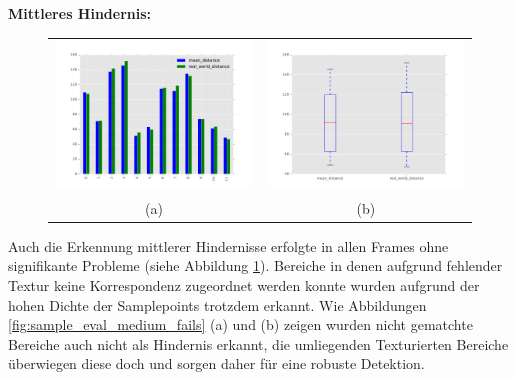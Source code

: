 	\noindent
	\textbf{Mittleres Hindernis:}\\

	\begin{figure}[h]
		\centering
		\begin{tabular}{cc}
		\includegraphics[width=7cm]{img/evaluation/sample_medium_bar}&
		\includegraphics[width=7cm]{img/evaluation/sample_medium_box}\\
		 (a) & (b)
		\end{tabular}
		\caption{}
	    \label{fig:sample_eval_medium}
	\end{figure}

	\noindent
	Auch die Erkennung mittlerer Hindernisse erfolgte in allen Frames ohne signifikante Probleme (siehe Abbildung \ref{fig:sample_eval_medium}). Bereiche in denen aufgrund fehlender Textur keine Korrespondenz zugeordnet werden konnte wurden aufgrund der hohen Dichte der Samplepoints trotzdem erkannt. Wie Abbildungen \ref{fig:sample_eval_medium_fails} (a) und (b) zeigen wurden nicht gematchte Bereiche auch nicht als Hindernis erkannt, die umliegenden Texturierten Bereiche überwiegen diese doch und sorgen daher für eine robuste Detektion. 


